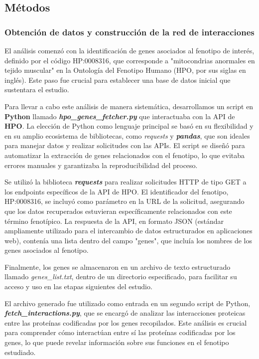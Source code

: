 \subsection{\textbf{Métodos}}

\subsubsection{Obtención de datos y construcción de la red de interacciones}

El análisis comenzó con la identificación de genes asociados al fenotipo de interés, definido por el código HP:0008316, que corresponde a "mitocondrias anormales en tejido muscular" en la Ontología del Fenotipo Humano (HPO, por sus siglas en inglés). Este paso fue crucial para establecer una base de datos inicial que sustentara el estudio.

Para llevar a cabo este análisis de manera sistemática, desarrollamos un script en \textbf{Python} llamado \textbf{\textit{hpo\_genes\_fetcher.py}} que interactuaba con la API de \textbf{HPO}. La elección de Python como lenguaje principal se basó en su flexibilidad y en su amplio ecosistema de bibliotecas, como \textit{requests} y \textbf{\textit{pandas}}, que son ideales para manejar datos y realizar solicitudes con las APIs. El script se diseñó para automatizar la extracción de genes relacionados con el fenotipo, lo que evitaba errores manuales y garantizaba la reproducibilidad del proceso.

Se utilizó la biblioteca \textbf{\textit{requests}} para realizar solicitudes HTTP de tipo GET a los endpoints específicos de la API de HPO. El identificador del fenotipo, HP:0008316, se incluyó como parámetro en la URL de la solicitud, asegurando que los datos recuperados estuvieran específicamente relacionados con este término fenotípico. La respuesta de la API, en formato JSON (estándar ampliamente utilizado para el intercambio de datos estructurados en aplicaciones web), contenía una lista dentro del campo "genes", que incluía los nombres de los genes asociados al fenotipo.

Finalmente, los genes se almacenaron en un archivo de texto estructurado llamado \textit{genes\_list.txt}, dentro de un directorio especificado, para facilitar su acceso y uso en las etapas siguientes del estudio.

El archivo generado fue utilizado como entrada en un segundo script de Python, \textbf{\textit{fetch\_interactions.py}}, que se encargó de analizar las interacciones proteicas entre las proteínas codificadas por los genes recopilados. Este análisis es crucial para comprender cómo interactúan entre sí las proteínas codificadas por los genes, lo que puede revelar información sobre sus funciones en el fenotipo estudiado.

